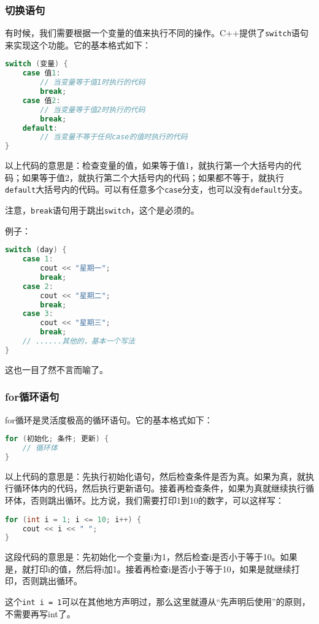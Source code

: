 \documentclass[../main.tex]{subfiles}
\begin{document}
\subsubsection{切换语句}
有时候，我们需要根据一个变量的值来执行不同的操作。C++提供了\texttt{switch}语句来实现这个功能。它的基本格式如下：
\begin{lstlisting}[language=C++]
switch (变量) {
    case 值1:
        // 当变量等于值1时执行的代码
        break;
    case 值2:
        // 当变量等于值2时执行的代码
        break;
    default:
        // 当变量不等于任何case的值时执行的代码
}
\end{lstlisting}
以上代码的意思是：检查变量的值，如果等于值1，就执行第一个大括号内的代码；如果等于值2，就执行第二个大括号内的代码；如果都不等于，就执行\texttt{default}大括号内的代码。可以有任意多个\texttt{case}分支，也可以没有\texttt{default}分支。

注意，\texttt{break}语句用于跳出\texttt{switch}，这个是必须的。

例子：
\begin{lstlisting}[language=C++]
switch (day) {
    case 1:
        cout << "星期一";
        break;
    case 2:
        cout << "星期二";
        break;
    case 3:
        cout << "星期三";
        break;
    // ......其他的，基本一个写法
}
\end{lstlisting}
这也一目了然不言而喻了。

\subsubsection{for循环语句}

for循环是灵活度极高的循环语句。它的基本格式如下：
\begin{lstlisting}[language=C++]
for (初始化; 条件; 更新) {
    // 循环体
}
\end{lstlisting}
以上代码的意思是：先执行初始化语句，然后检查条件是否为真。如果为真，就执行循环体内的代码，然后执行更新语句。接着再检查条件，如果为真就继续执行循环体，否则跳出循环。比方说，我们需要打印1到10的数字，可以这样写：
\begin{lstlisting}[language=C++]
for (int i = 1; i <= 10; i++) {
    cout << i << " ";
}
\end{lstlisting}
这段代码的意思是：先初始化一个变量i为1，然后检查i是否小于等于10。如果是，就打印i的值，然后将i加1。接着再检查i是否小于等于10，如果是就继续打印，否则跳出循环。

这个\texttt{int i = 1}可以在其他地方声明过，那么这里就遵从“先声明后使用”的原则，不需要再写int了。
\end{document}
